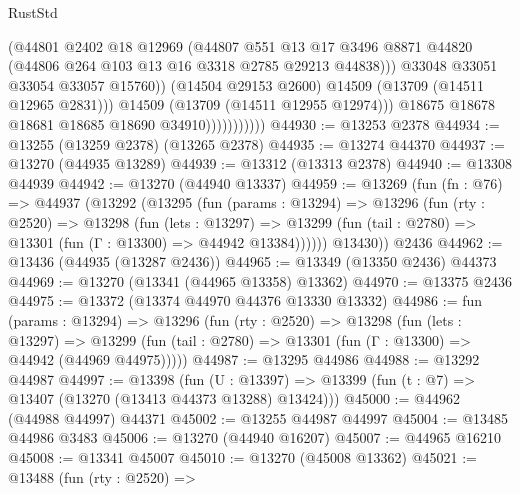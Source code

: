 \begin{lexlean}{RustStd}
\begin{coremodule}
                                  (@44801
                                    @2402
                                    @18
                                    @12969
                                    (@44807
                                      @551
                                      @13
                                      @17
                                      @3496
                                      @8871
                                      @44820
                                      (@44806 @264 @103 @13 @16 @3318 @2785 @29213 @44838)))
                                  @33048
                                  @33051
                                  @33054
                                  @33057
                                  @15760))
                              (@14504 @29153 @2600)
                              @14509
                              (@13709 (@14511 @12965 @2831)))
                            @14509
                            (@13709 (@14511 @12955 @12974)))
                          @18675
                          @18678
                          @18681
                          @18685
                          @18690
                          @34910)))))))))))
@44930 := @13253 @2378
@44934 := @13255 (@13259 @2378) (@13265 @2378)
@44935 := @13274 @44370
@44937 := @13270 (@44935 @13289)
@44939 := @13312 (@13313 @2378)
@44940 := @13308 @44939
@44942 := @13270 (@44940 @13337)
@44959 := @13269
    (fun (fn : @76) =>
    @44937
      (@13292
        (@13295
          (fun (params : @13294) =>
          @13296
            (fun (rty : @2520) =>
            @13298
              (fun (lets : @13297) =>
              @13299 (fun (tail : @2780) => @13301 (fun (Γ : @13300) => @44942 @13384))))))
        @13430))
    @2436
@44962 := @13436 (@44935 (@13287 @2436))
@44965 := @13349 (@13350 @2436) @44373
@44969 := @13270 (@13341 (@44965 @13358) @13362)
@44970 := @13375 @2436
@44975 := @13372 (@13374 @44970 @44376 @13330 @13332)
@44986 := fun (params : @13294) =>
  @13296
    (fun (rty : @2520) =>
    @13298
      (fun (lets : @13297) =>
      @13299 (fun (tail : @2780) => @13301 (fun (Γ : @13300) => @44942 (@44969 @44975)))))
@44987 := @13295 @44986
@44988 := @13292 @44987
@44997 := @13398
    (fun (U : @13397) => @13399 (fun (t : @7) => @13407 (@13270 (@13413 @44373 @13288) @13424)))
@45000 := @44962 (@44988 @44997) @44371
@45002 := @13255 @44987 @44997
@45004 := @13485 @44986 @3483
@45006 := @13270 (@44940 @16207)
@45007 := @44965 @16210
@45008 := @13341 @45007
@45010 := @13270 (@45008 @13362)
@45021 := @13488
    (fun (rty : @2520) =>

\end{coremodule}
\end{lexlean}
